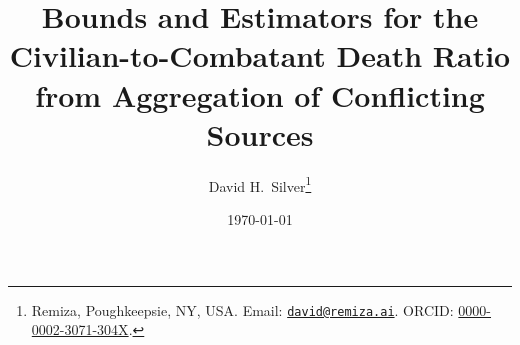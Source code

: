 \documentclass[11pt,a4paper]{article}
\title{\textbf{Bounds and Estimators for the Civilian-to-Combatant Death Ratio\\ from Aggregation of Conflicting Sources}}
\author{David H.\ Silver\thanks{%
  Remiza, Poughkeepsie, NY, USA.
  Email: \href{mailto:david@remiza.ai}{\texttt{david@remiza.ai}}.
  ORCID: \href{https://orcid.org/0000-0002-3071-304X}{0000-0002-3071-304X}.}}
\date{\today}
\theoremstyle{plain}
\theoremstyle{definition}
\theoremstyle{remark}
\begin{document}
\maketitle

\begin{abstract}

\end{abstract}













\end{document}

